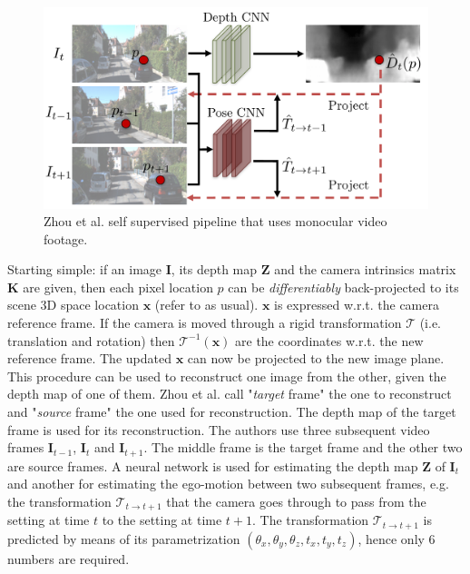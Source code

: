 \begin{figure}
	\centering
	\includegraphics[scale=0.3]{figs/sfmlearner}
	\caption{Zhou et al. self supervised pipeline \cite{SfMLearner} that uses monocular video footage. \label{fig:sfmlearner}}
\end{figure}

Starting simple: if an image $\mathbf{I}$, its depth map $\mathbf{Z}$ and the camera intrinsics matrix $\mathbf{K}$ are given, then each pixel location $p$ can be \textit{differentiably} back-projected to its scene 3D space location $\mathbf{x}$ (refer to \cite{multiview} as usual).
$\mathbf{x}$ is expressed w.r.t. the camera reference frame.
If the camera is moved through a rigid transformation $\mathcal{T}$ (i.e. translation and rotation) then $\mathcal{T}^{-1} (\mathbf{x})$ are the coordinates w.r.t. the new reference frame.
The updated $\mathbf{x}$ can now be projected to the new image plane.
This procedure can be used to reconstruct one image from the other, given the depth map of one of them.
Zhou et al. call "\textit{target} frame" the one to reconstruct and "\textit{source} frame" the one used for reconstruction.
The depth map of the target frame is used for its reconstruction.
The authors use three subsequent video frames $\mathbf{I}_{t-1}$, $\mathbf{I}_{t}$ and $\mathbf{I}_{t+1}$.
The middle frame is the target frame and the other two are source frames.
A neural network is used for estimating the depth map $\mathbf{Z}$ of $\mathbf{I}_{t}$ and another for estimating the ego-motion between two subsequent frames, e.g. the transformation $\mathcal{T}_{t \rightarrow t+1}$ that the camera goes through to pass from the setting at time $t$ to the setting at time $t+1$.
The transformation $\mathcal{T}_{t \rightarrow t+1}$ is predicted by means of its parametrization $(\theta_{x}, \theta_{y}, \theta_{z}, t_{x}, t_{y}, t_{z})$, hence only 6 numbers are required.

